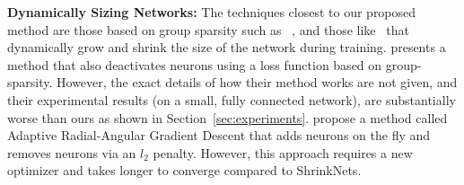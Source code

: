 \noindent\textbf{Dynamically Sizing Networks: }The techniques closest to our
proposed method are those based on group sparsity such as
~\cite{Scardapane2017}, and those like~\cite{Philipp} that dynamically grow and shrink
 the size of the network during training.  \cite{Scardapane2017}
presents a method that also deactivates neurons using a loss function based on
group-sparsity.  However, the exact details of how their method works are not
given, and their experimental results (on a small, fully connected network), are
substantially worse than ours as shown in Section~\ref{sec:experiments}.
\cite{Philipp} propose a method called Adaptive Radial-Angular Gradient Descent
that adds neurons on the fly and removes neurons via an $l_2$ penalty.  However,
this approach requires a new optimizer and takes longer to converge compared to
ShrinkNets.



